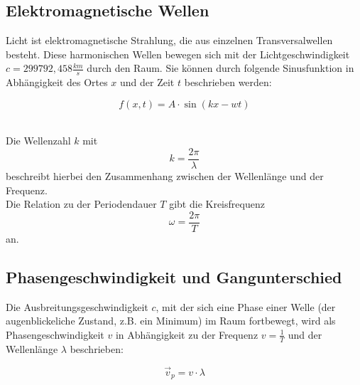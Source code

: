 \documentclass[12pt,a4paper,titlepage,headinclude,bibtotoc]{scrartcl}
\begin{document}
\subsection{Elektromagnetische Wellen}
Licht ist elektromagnetische Strahlung, die aus einzelnen Transversalwellen besteht. Diese harmonischen Wellen bewegen sich mit der Lichtgeschwindigkeit $c= 299 792,458 \frac{km}{s}$ durch den Raum. Sie können durch folgende Sinusfunktion in Abhängigkeit des Ortes $x$ und der Zeit $t$ beschrieben werden:
\\
\par %
\begin{equation}
f(x,t)= {A}\cdot{\sin(kx-wt)}
\end{equation}
\\
\par

Die Wellenzahl $k$ mit \begin{equation}k=\frac{2\pi}{\lambda}\end{equation} beschreibt hierbei den Zusammenhang zwischen der Wellenlänge und der Frequenz. \\
Die Relation zu der Periodendauer $T$ gibt die Kreisfrequenz \begin{equation}\omega =\frac{2\pi}{T} \end{equation} an.  




\subsection{Phasengeschwindigkeit und Gangunterschied}
Die Ausbreitungsgeschwindigkeit $c$, mit der sich eine Phase einer Welle (der augenblickeliche Zustand, z.B. ein Minimum) im Raum fortbewegt, wird als Phasengeschwindigkeit $v$ in Abhängigkeit zu der Frequenz $v=\frac{1}{T}$ und der Wellenlänge $\lambda$ beschrieben:\\
\par
\begin{equation}
\vec{v}_p = {v}\cdot{\lambda}
\end{equation}
\\
\par
\end{document}

